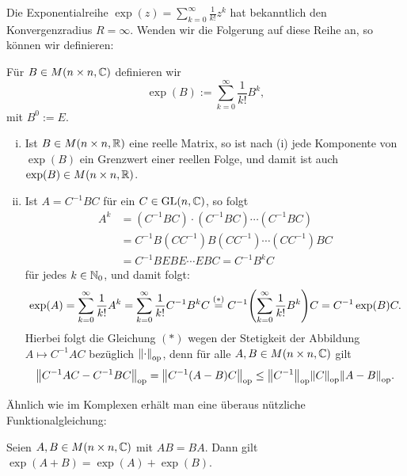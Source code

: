 Die Exponentialreihe $\exp(z) = \sum_{k=0}^{\infty} \frac{1}{k!} z^k$ hat bekanntlich den Konvergenzradius $R = \infty$.
Wenden wir die Folgerung auf diese Reihe an, so können wir definieren:

\begin{definition}
	\label{def:10.8}
	Für $B \in M(n \times n,\mathbb{C})$ definieren wir
	\[
	\exp(B) := \sum\limits_{k=0}^\infty \frac{1}{k!} B^k,
	\]
	mit $B^0 := E$. 
\end{definition}

\begin{bemerkung}
	\label{bem:10.9}
	\begin{enumerate}[(i)]
		\item Ist $B \in M(n \times n,\mathbb{R})$ eine reelle Matrix, so ist nach (i) jede Komponente von $\exp(B)$ ein Grenzwert einer reellen Folge, und damit ist auch $\exp(B) \in M(n \times n,\mathbb{R})$.
		\item Ist $A = C^{-1} BC$ für ein $C \in \operatorname{GL}(n,\mathbb{C})$, so folgt
		\begin{align*}
		A^{k} &= (C^{-1}BC)\cdot (C^{-1}BC) \cdots (C^{-1}BC) \\
		&= C^{-1} B (CC^{-1}) B (CC^{-1}) \cdots (CC^{-1})BC \\
		&= C^{-1} B E B E \cdots E BC = C^{-1} B^k C
		\end{align*}
		für jedes $k \in \mathbb{N}_0$, und damit folgt:
		\[
			\exp(A) = \sum\limits_{k=0}^{\infty} \frac{1}{k!} A^k = \sum_{k=0}^{\infty} \frac{1}{k!} C^{-1} B^{k} C \stackrel{(*)}{=} C^{-1} \enb{\sum_{k=0}^{\infty} \frac{1}{k!} B^{k}} C = C^{-1} \exp(B) C.
		\]
		Hierbei folgt die Gleichung $(*)$ wegen der Stetigkeit der Abbildung $A \mapsto C^{-1} AC$ bezüglich $\left\lVert\cdot\right\rVert_{\text{op}}$, denn für alle $A,B \in M(n \times n,\mathbb{C})$ gilt
		\[
			\opn{C^{-1}AC - C^{-1}BC} = \opn{C^{-1}(A-B)C} \leq \opn{C^{-1}} \opn{C} \opn{A-B}.
		\]
	\end{enumerate}
\end{bemerkung}

Ähnlich wie im Komplexen erhält man eine überaus nützliche Funktionalgleichung:

\begin{lemma}
	\label{lemma:10.10}
	Seien $A,B \in M(n \times n,\mathbb{C})$ mit $AB = BA$.
	Dann gilt $\exp(A+B) = \exp(A) + \exp(B)$.
\end{lemma}

